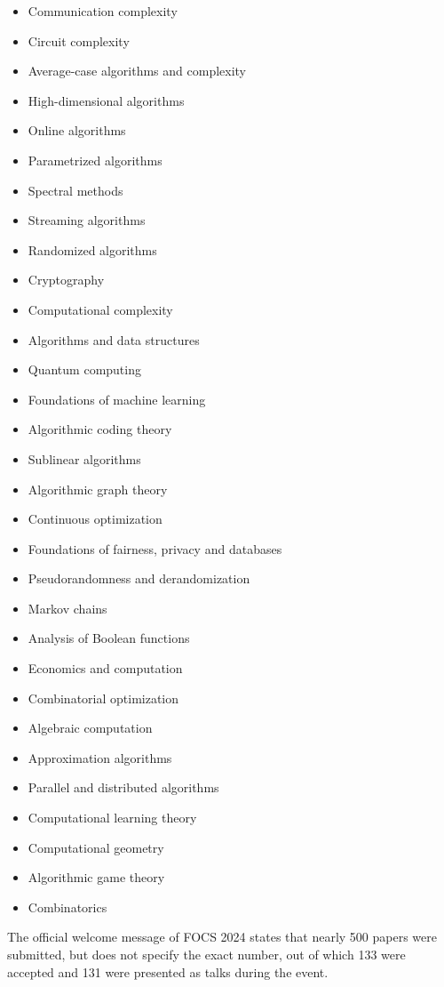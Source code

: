 \documentclass[
	a4paper, %
	10pt, %
	unnumberedsections, %
	twoside, %
]{LTJournalArticle}
\theoremstyle{remark}
\begin{document}
\begin{itemize}
	\item Communication complexity
	\item Circuit complexity
	\item Average-case algorithms and complexity
	\item High-dimensional algorithms
	\item Online algorithms
	\item Parametrized algorithms
	\item Spectral methods
	\item Streaming algorithms
	\item Randomized algorithms
	\item Cryptography
	\item Computational complexity
	\item Algorithms and data structures
	\item Quantum computing
	\item Foundations of machine learning
	\item Algorithmic coding theory
	\item Sublinear algorithms
	\item Algorithmic graph theory
	\item Continuous optimization
	\item Foundations of fairness, privacy and databases
	\item Pseudorandomness and derandomization
	\item Markov chains
	\item Analysis of Boolean functions
	\item Economics and computation
	\item Combinatorial optimization
	\item Algebraic computation
	\item Approximation algorithms
	\item Parallel and distributed algorithms
	\item Computational learning theory
	\item Computational geometry
	\item Algorithmic game theory
	\item Combinatorics
\end{itemize}

The official welcome message of FOCS 2024 states that nearly 500 papers were submitted, but does not specify the exact number, out of which 133
were accepted and 131 were presented as talks during the event.
\end{document}

